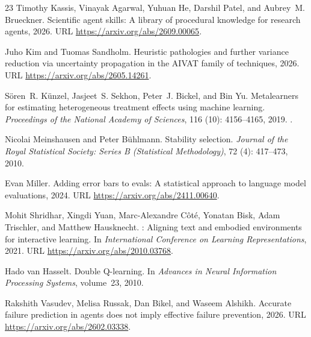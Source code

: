 \begin{thebibliography}{23}
Timothy Kassis, Vinayak Agarwal, Yuhuan He, Darshil Patel, and Aubrey~M.
  Brueckner.
\newblock Scientific agent skills: A library of procedural knowledge for
  research agents, 2026.
\newblock URL \url{https://arxiv.org/abs/2609.00065}.

Juho Kim and Tuomas Sandholm.
\newblock Heuristic pathologies and further variance reduction via uncertainty
  propagation in the {AIVAT} family of techniques, 2026.
\newblock URL \url{https://arxiv.org/abs/2605.14261}.

S\"oren~R. K\"unzel, Jasjeet~S. Sekhon, Peter~J. Bickel, and Bin Yu.
\newblock Metalearners for estimating heterogeneous treatment effects using
  machine learning.
\newblock \emph{Proceedings of the National Academy of Sciences}, 116
  (10): 4156--4165, 2019.
\newblock {}.

Nicolai Meinshausen and Peter B{\"u}hlmann.
\newblock Stability selection.
\newblock \emph{Journal of the Royal Statistical Society: Series B (Statistical
  Methodology)}, 72 (4): 417--473, 2010.

Evan Miller.
\newblock Adding error bars to evals: A statistical approach to language model
  evaluations, 2024.
\newblock URL \url{https://arxiv.org/abs/2411.00640}.

Mohit Shridhar, Xingdi Yuan, Marc-Alexandre C\^{o}t\'{e}, Yonatan Bisk, Adam
  Trischler, and Matthew Hausknecht.
: Aligning text and embodied environments for interactive
  learning.
\newblock In \emph{International Conference on Learning Representations}, 2021.
\newblock URL \url{https://arxiv.org/abs/2010.03768}.

Hado van Hasselt.
\newblock Double {Q}-learning.
\newblock In \emph{Advances in Neural Information Processing Systems},
  volume~23, 2010.

Rakshith Vasudev, Melisa Russak, Dan Bikel, and Waseem Alshikh.
\newblock Accurate failure prediction in agents does not imply effective
  failure prevention, 2026.
\newblock URL \url{https://arxiv.org/abs/2602.03338}.


\end{thebibliography}
